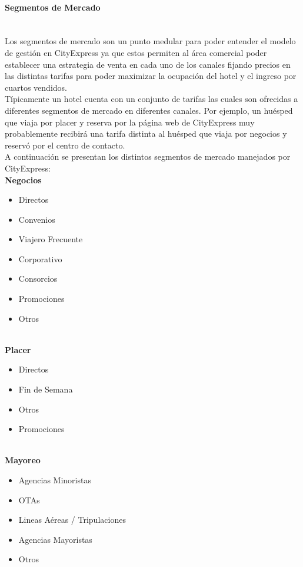 \documentclass{article}\usepackage[]{graphicx}\usepackage[]{color}
\begin{document}
\paragraph{Segmentos de Mercado}
~\\
Los segmentos de mercado son un punto medular para poder entender el modelo de gestión en CityExpress ya que estos permiten al área comercial poder establecer una estrategia de venta en cada uno de los canales fijando precios en las distintas tarifas para poder maximizar la ocupación del hotel y el ingreso por cuartos vendidos. ~\\
Típicamente un hotel cuenta con un conjunto de tarifas las cuales son ofrecidas a diferentes segmentos de mercado en diferentes canales. Por ejemplo, un huésped que viaja por placer y reserva por la página web de CityExpress muy probablemente recibirá una tarifa distinta al huésped que viaja por negocios y reservó por el centro de contacto.
~\\
A continuación se presentan los distintos segmentos de mercado manejados por CityExpress:
~\\
\textbf{Negocios}
\begin{itemize}[noitemsep]
\item Directos
\item Convenios
\item Viajero Frecuente
\item Corporativo
\item Consorcios
\item Promociones
\item Otros
\end{itemize}
~\\
\textbf{Placer}
\begin{itemize}[noitemsep]
\item Directos
\item Fin de Semana
\item Otros
\item Promociones
\end{itemize}
~\\
\textbf{Mayoreo}
\begin{itemize}[noitemsep]
\item Agencias Minoristas
\item OTAs
\item Lineas Aéreas / Tripulaciones
\item Agencias Mayoristas
\item Otros
\end{itemize}
~\\
\end{document}
